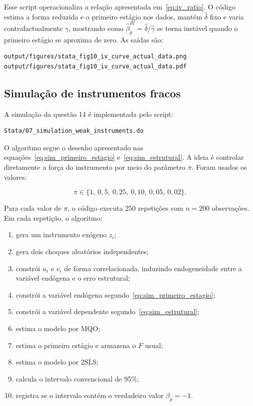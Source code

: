 \documentclass[12pt,a4paper]{article}
\begin{document}
Esse script operacionaliza a relação apresentada em~\eqref{eq:iv_ratio}. O código estima a forma reduzida e o primeiro estágio nos dados, mantém \(\hat{\delta}\) fixo e varia contrafactualmente \(\gamma\), mostrando como \(\hat{\beta}^{IV}_p=\hat{\delta}/\hat{\gamma}\) se torna instável quando o primeiro estágio se aproxima de zero. As saídas são:

\begin{verbatim}
output/figures/stata_fig10_iv_curve_actual_data.png
output/figures/stata_fig10_iv_curve_actual_data.pdf
\end{verbatim}

\subsection*{Simulação de instrumentos fracos}

A simulação da questão 14 é implementada pelo script:

\begin{verbatim}
Stata/07_simulation_weak_instruments.do
\end{verbatim}

O algoritmo segue o desenho apresentado nas equações~\eqref{eq:sim_primeiro_estagio} e~\eqref{eq:sim_estrutural}. A ideia é controlar diretamente a força do instrumento por meio do parâmetro \(\pi\). Foram usados os valores:

\[
\pi \in \{1,\ 0{,}5,\ 0{,}25,\ 0{,}10,\ 0{,}05,\ 0{,}02\}.
\]

Para cada valor de \(\pi\), o código executa \(250\) repetições com \(n=200\) observações. Em cada repetição, o algoritmo:

\begin{enumerate}[label=(\roman*)]
    \item gera um instrumento exógeno \(z_i\);
    \item gera dois choques aleatórios independentes;
    \item constrói \(u_i\) e \(v_i\) de forma correlacionada, induzindo endogeneidade entre a variável endógena e o erro estrutural;
    \item constrói a variável endógena segundo~\eqref{eq:sim_primeiro_estagio};
    \item constrói a variável dependente segundo~\eqref{eq:sim_estrutural};
    \item estima o modelo por MQO;
    \item estima o primeiro estágio e armazena o \(F\) usual;
    \item estima o modelo por 2SLS;
    \item calcula o intervalo convencional de 95\%;
    \item registra se o intervalo contém o verdadeiro valor \(\beta_p=-1\).
\end{enumerate}
\end{document}
